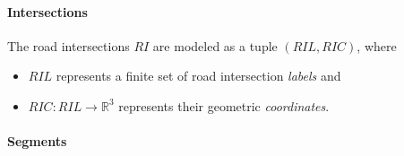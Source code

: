 \paragraph{Intersections}
\label{intersections}

The road intersections $RI$ are modeled as a tuple $(RIL, RIC)$, where
\begin{itemize}
	\item $RIL$ represents a finite set of road intersection \textit{labels} and
	\item $RIC: RIL \rightarrow \mathbb{R}^3$ represents their geometric \textit{coordinates}.
\end{itemize}

\paragraph{Segments}
\label{segments}


